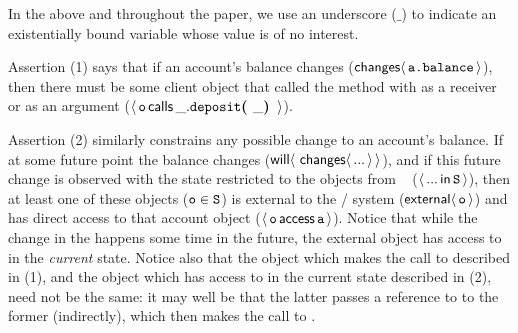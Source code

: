 \noindent 
In the above and throughout the paper, we use an underscore ($\_$) to indicate an existentially bound variable whose 
value is of no interest.

\vspace{.2cm}

Assertion (1) %
says that if   an account's balance changes
($\Changes{\prg{a.balance}}$),
then there must be some client object 
that %
called the  method with  as a receiver or as an argument 
($\Calls{\prg{o}} {\prg{deposit}} {\_} {\_}$).
 
Assertion (2) similarly constrains any possible change to an 
account's balance.
If at some future point the balance changes  (${\Future{\,\Changes{...}}}$),  %
and if this future change is observed with the state restricted to the objects from \SF~ (\ie $\Using{...}{\prg{S}}$), then 
at least one of these objects ($\prg{o}\in\SF$) is external to the / system ($\External{\prg{o}}$) and 
has direct access to that account object
($\CanAccess{\prg{o}}{\prg{a}}$).
Notice that while the change in the  happens some time in the future,
the external object  has access to  in the \emph{current} state.
Notice also that the object which makes the call to  described in (1), and the object which 
has access to  in the current state described in (2), need not be the same: it may well be that the
latter passes  a reference to  to the former (indirectly), which then makes the call
to .

